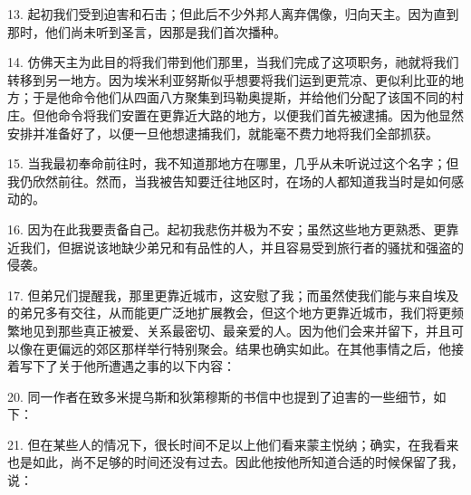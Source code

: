 13. 起初我们受到迫害和石击；但此后不少外邦人离弃偶像，归向天主。因为直到那时，他们尚未听到圣言，因那是我们首次播种。\par

14. 仿佛天主为此目的将我们带到他们那里，当我们完成了这项职务，祂就将我们转移到另一地方。因为埃米利亚努斯似乎想要将我们运到更荒凉、更似利比亚的地方；于是他命令他们从四面八方聚集到玛勒奥提斯，并给他们分配了该国不同的村庄。但他命令将我们安置在更靠近大路的地方，以便我们首先被逮捕。因为他显然安排并准备好了，以便一旦他想逮捕我们，就能毫不费力地将我们全部抓获。\par

15. 当我最初奉命前往时，我不知道那地方在哪里，几乎从未听说过这个名字；但我仍欣然前往。然而，当我被告知要迁往地区时，在场的人都知道我当时是如何感动的。\par

16. 因为在此我要责备自己。起初我悲伤并极为不安；虽然这些地方更熟悉、更靠近我们，但据说该地缺少弟兄和有品性的人，并且容易受到旅行者的骚扰和强盗的侵袭。\par

17. 但弟兄们提醒我，那里更靠近城市，这安慰了我；而虽然使我们能与来自埃及的弟兄多有交往，从而能更广泛地扩展教会，但这个地方更靠近城市，我们将更频繁地见到那些真正被爱、关系最密切、最亲爱的人。因为他们会来并留下，并且可以像在更偏远的郊区那样举行特别聚会。结果也确实如此。在其他事情之后，他接着写下了关于他所遭遇之事的以下内容：\par

\par

\par

20. 同一作者在致多米提乌斯和狄第穆斯的书信中也提到了迫害的一些细节，如下：\par

21. 但在某些人的情况下，很长时间不足以上他们看来蒙主悦纳；确实，在我看来也是如此，尚不足够的时间还没有过去。因此他按他所知道合适的时候保留了我，说：\par

